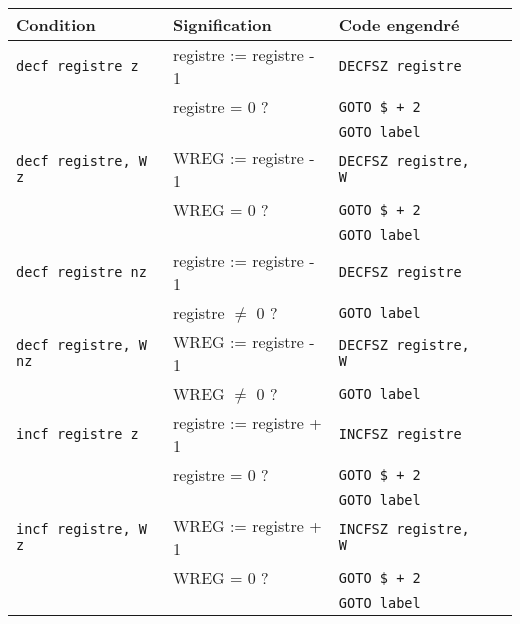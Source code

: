 \begin{table}[!ht]
  \centering
  \small
  \begin{tabular}{lllll}
    \textbf{Condition} & \textbf{Signification} & \textbf{Code engendré}\\
    \hline
                           \texttt{decf registre z}   & registre := registre - 1    &\texttt{DECFSZ registre}\\
                                                      & registre = 0 ?              &\texttt{GOTO \$ + 2}      \\
                                                      &                             &\texttt{GOTO label}      \\
    \rowcolor{\fondTableau}\texttt{decf registre, W z}& WREG := registre - 1 &\texttt{DECFSZ registre, W}  \\
    \rowcolor{\fondTableau}                           & WREG = 0 ?           &\texttt{GOTO \$ + 2}          \\
    \rowcolor{\fondTableau}                           &                      &\texttt{GOTO label}          \\
                           \texttt{decf registre nz}  & registre := registre - 1    &\texttt{DECFSZ registre} \\
                                                      & registre $\ne$ 0 ?              &\texttt{GOTO label}   \\
    \rowcolor{\fondTableau}\texttt{decf registre, W nz}& WREG := registre - 1 &\texttt{DECFSZ registre, W}  \\
    \rowcolor{\fondTableau}                           & WREG $\ne$ 0 ?           &\texttt{GOTO label}        \\
                           \texttt{incf registre z}   & registre := registre + 1    &\texttt{INCFSZ registre} \\
                                                      & registre = 0 ?              &\texttt{GOTO \$ + 2}      \\
                                                      &                             &\texttt{GOTO label}      \\
    \rowcolor{\fondTableau}\texttt{incf registre, W z}& WREG := registre + 1 &\texttt{INCFSZ registre, W} \\
    \rowcolor{\fondTableau}                           & WREG = 0 ?           &\texttt{GOTO \$ + 2}          \\
    \rowcolor{\fondTableau}                           &                      &\texttt{GOTO label}          \\

\end{tabular}
\end{table}
